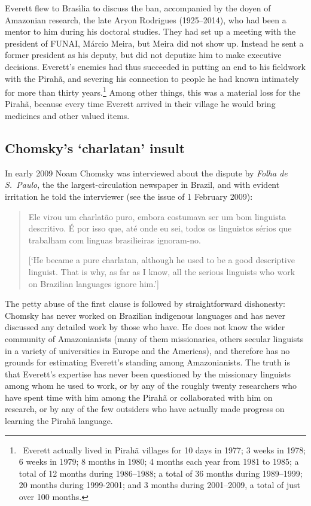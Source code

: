 \documentclass[output=paper,colorlinks,citecolor=brown
]{langscibook}
\begin{document}
Everett flew to Bras{\'\i}lia to discuss the ban, accompanied by the
doyen of Amazonian research, the late Aryon Rodrigues (1925--2014),
who had been a mentor to him during his doctoral studies. They had
set up a meeting with the president of FUNAI, M{\'a}rcio Meira, but
Meira did not show up. Instead he sent a former president as his
deputy, but did not deputize him to make executive decisions.
Everett's enemies had thus succeeded in putting an end to his fieldwork
with the Pirah{\~a}, and severing his connection to people he had known
intimately for more than thirty years.\footnote{\,
   Everett actually lived in Pirah{\~a} villages for 10 days in 1977;
   3 weeks in 1978; 6 weeks in 1979; 8 months in 1980; 4 months each year
   from 1981 to 1985; a total of 12 months during 1986--1988; a total of
   36 months during 1989--1999; 20 months during 1999-2001; and 3 months
   during 2001--2009, a total of just over 100 months.}
Among other things, this was a material loss for the Pirah{\~a}, because
every time Everett arrived in their village he would bring medicines and
other valued items.

\subsection{Chomsky's `charlatan' insult}

In early 2009 Noam Chomsky was interviewed about the dispute by
\textit{Folha de S.~Paulo}, the the largest-circulation newspaper in
Brazil, and with evident irritation he told the interviewer (see the
issue of 1 February 2009):
\begin{quote}
Ele virou um charlat{\~a}o puro, embora costumava ser um bom linguista
descritivo. {\'E} por isso que, at{\'e} onde eu sei, todos os linguistos
s{\'e}rios que trabalham com linguas brasilieiras ignoram-no.

[`He became a pure charlatan, although he used to be a good descriptive
linguist. That is why, as far as I know, all the serious linguists
who work on Brazilian languages ignore him.']
\end{quote}

The petty abuse of the first clause is followed by straightforward
dishonesty: Chomsky has never worked on Brazilian indigenous languages
and has never discussed any detailed work by those who have. He does
not know the wider community of Amazonianists (many of them missionaries,
others secular linguists in a variety of universities in Europe and the
Americas), and therefore has no grounds for estimating Everett's standing
among Amazonianists. The truth is that Everett's expertise has never been
questioned by the missionary linguists among whom he used to work, or by
any of the roughly twenty researchers who have spent time with him among
the Pirah{\~a} or collaborated with him on research, or by any of the
few outsiders who have actually made progress on learning the Pirah{\~a}
language.
\end{document}

